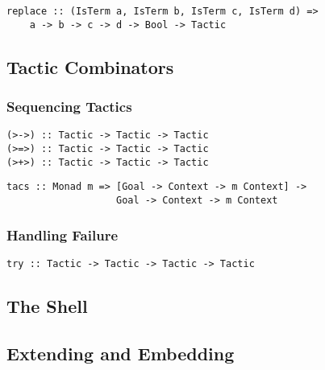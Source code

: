 \begin{verbatim}
replace :: (IsTerm a, IsTerm b, IsTerm c, IsTerm d) =>
    a -> b -> c -> d -> Bool -> Tactic
\end{verbatim}

\subsection{Tactic Combinators}

\subsubsection{Sequencing Tactics}

\begin{verbatim}
(>->) :: Tactic -> Tactic -> Tactic
(>=>) :: Tactic -> Tactic -> Tactic
(>+>) :: Tactic -> Tactic -> Tactic
\end{verbatim}

\begin{verbatim}
tacs :: Monad m => [Goal -> Context -> m Context] -> 
                   Goal -> Context -> m Context
\end{verbatim}

\subsubsection{Handling Failure}

\begin{verbatim}
try :: Tactic -> Tactic -> Tactic -> Tactic
\end{verbatim}

\subsection{The Shell}

\subsection{Extending and Embedding}
